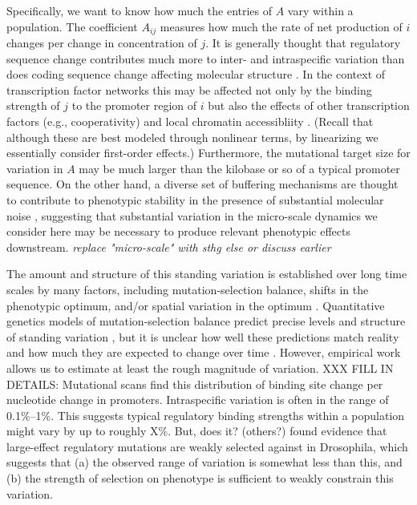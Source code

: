 \documentclass[9 pt]{article}
\newcommand{\plr}[1]{{\color{blue}\it #1}}
\newcommand{\1}{\mathbbm{1}}
\begin{document}
  Specifically, we want to know how much the entries of $A$ vary within a population.
  The coefficient $A_{ij}$ measures how much the rate of net production of $i$ changes
  per change in concentration of $j$.
  It is generally thought that regulatory sequence change contributes much more to inter- and intraspecific variation
  than does coding sequence change affecting molecular structure \citep{schmidt2010vertebrate}.
  In the context of transcription factor networks this may be affected 
  not only by the binding strength of $j$ to the promoter region of $i$
  but also the effects of other transcription factors (e.g., cooperativity)
  and local chromatin accessibliity \citep{stefflova2013cooperativity}.
  (Recall that although these are best modeled through nonlinear terms,
  by linearizing we essentially consider first-order effects.)
  Furthermore, the mutational target size for variation in $A$ may be much larger than the kilobase or so of a typical promoter sequence.
  On the other hand, a diverse set of buffering mechanisms are thought to contribute to phenotypic stability
  in the presence of substantial molecular noise \citep{canalization,buffering},
  suggesting that substantial variation in the micro-scale dynamics we consider here
  may be necessary to produce relevant phenotypic effects downstream.
  \plr{replace "micro-scale" with sthg else or discuss earlier}

  The amount and structure of this standing variation is established over long time scales
  by many factors, including
  mutation-selection balance, 
  shifts in the phenotypic optimum,
  and/or spatial variation in the optimum \citep{hansen1996translating}.
  Quantitative genetics models of mutation-selection balance 
  predict precise levels and structure of standing variation \citep{kimura_mutsel,lande_mutsel,lande1981models},
  but it is unclear how well these predictions match reality \citep{johnson_barton}
  and how much they are expected to change over time \citep{arnold_changing_G}.
  However, empirical work allows us to estimate at least the rough magnitude of variation.
  XXX FILL IN DETAILS: 
  Mutational scans find this distribution of binding site change per nucleotide change in promoters.
  Intraspecific variation is often in the range of 0.1\%--1\%.
  This suggests typical regulatory binding strengths within a population might vary by up to roughly X\%.
  But, does it?
  \citet{maria_and_sergey} (others?) found evidence that large-effect regulatory mutations are weakly selected against in Drosophila,
  which suggests that (a) the observed range of variation is somewhat less than this,
  and (b) the strength of selection on phenotype is sufficient to weakly constrain this variation.
\end{document}
